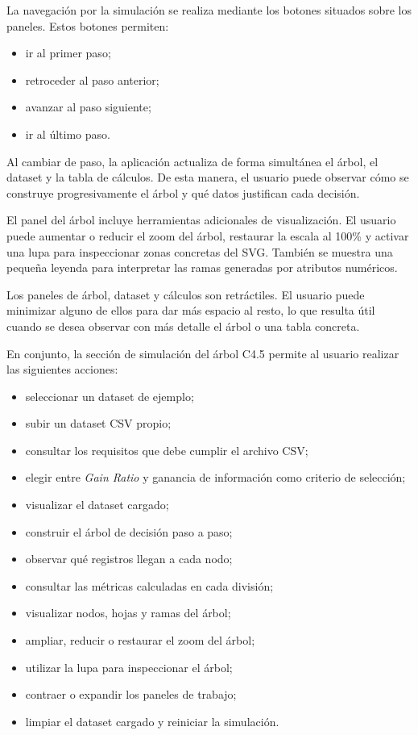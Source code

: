 La navegación por la simulación se realiza mediante los botones situados sobre los paneles. Estos botones permiten:

\begin{itemize}
    \item ir al primer paso;
    \item retroceder al paso anterior;
    \item avanzar al paso siguiente;
    \item ir al último paso.
\end{itemize}

Al cambiar de paso, la aplicación actualiza de forma simultánea el árbol, el dataset y la tabla de cálculos. De esta manera, el usuario puede observar cómo se construye progresivamente el árbol y qué datos justifican cada decisión.

El panel del árbol incluye herramientas adicionales de visualización. El usuario puede aumentar o reducir el zoom del árbol, restaurar la escala al 100\% y activar una lupa para inspeccionar zonas concretas del SVG. También se muestra una pequeña leyenda para interpretar las ramas generadas por atributos numéricos.

Los paneles de árbol, dataset y cálculos son retráctiles. El usuario puede minimizar alguno de ellos para dar más espacio al resto, lo que resulta útil cuando se desea observar con más detalle el árbol o una tabla concreta.

En conjunto, la sección de simulación del árbol C4.5 permite al usuario realizar las siguientes acciones:

\begin{itemize}
    \item seleccionar un dataset de ejemplo;
    \item subir un dataset CSV propio;
    \item consultar los requisitos que debe cumplir el archivo CSV;
    \item elegir entre \textit{Gain Ratio} y ganancia de información como criterio de selección;
    \item visualizar el dataset cargado;
    \item construir el árbol de decisión paso a paso;
    \item observar qué registros llegan a cada nodo;
    \item consultar las métricas calculadas en cada división;
    \item visualizar nodos, hojas y ramas del árbol;
    \item ampliar, reducir o restaurar el zoom del árbol;
    \item utilizar la lupa para inspeccionar el árbol;
    \item contraer o expandir los paneles de trabajo;
    \item limpiar el dataset cargado y reiniciar la simulación.
\end{itemize}

